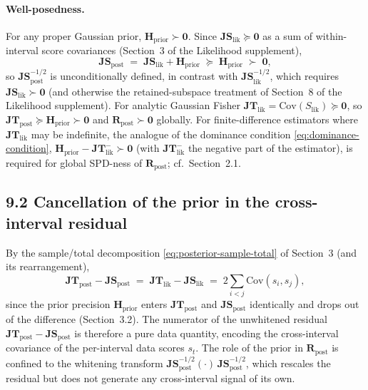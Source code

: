 \documentclass[11pt]{article}
\begin{document}
\paragraph{Well-posedness.}
For any proper Gaussian prior, $\mathbf H_{\mathrm{prior}} \succ \mathbf 0$. Since $\mathbf{JS}_{\mathrm{lik}} \succeq \mathbf 0$ as a sum of within-interval score covariances (Section~3 of the Likelihood supplement),
\begin{equation}
\mathbf{JS}_{\mathrm{post}}
\;=\;
\mathbf{JS}_{\mathrm{lik}} + \mathbf H_{\mathrm{prior}}
\;\succeq\;
\mathbf H_{\mathrm{prior}}
\;\succ\; \mathbf 0,
\label{eq:posterior-jspost-pd}
\end{equation}
so $\mathbf{JS}_{\mathrm{post}}^{-1/2}$ is unconditionally defined, in contrast with $\mathbf{JS}_{\mathrm{lik}}^{-1/2}$, which requires $\mathbf{JS}_{\mathrm{lik}} \succ \mathbf 0$ (and otherwise the retained-subspace treatment of Section~8 of the Likelihood supplement). For analytic Gaussian Fisher $\mathbf{JT}_{\mathrm{lik}} = \mathrm{Cov}(S_{\mathrm{lik}}) \succeq \mathbf 0$, so $\mathbf{JT}_{\mathrm{post}} \succeq \mathbf H_{\mathrm{prior}} \succ \mathbf 0$ and $\mathbf R_{\mathrm{post}} \succ \mathbf 0$ globally. For finite-difference estimators where $\mathbf{JT}_{\mathrm{lik}}$ may be indefinite, the analogue of the dominance condition \eqref{eq:dominance-condition}, $\mathbf H_{\mathrm{prior}} - \mathbf{JT}_{\mathrm{lik}}^{-} \succ \mathbf 0$ (with $\mathbf{JT}_{\mathrm{lik}}^{-}$ the negative part of the estimator), is required for global SPD-ness of $\mathbf R_{\mathrm{post}}$; cf.\ Section~2.1.

\subsection*{9.2 Cancellation of the prior in the cross-interval residual}

By the sample/total decomposition \eqref{eq:posterior-sample-total} of Section~3 (and its rearrangement),
\begin{equation}
\mathbf{JT}_{\mathrm{post}} - \mathbf{JS}_{\mathrm{post}}
\;=\;
\mathbf{JT}_{\mathrm{lik}} - \mathbf{JS}_{\mathrm{lik}}
\;=\;
2\sum_{i<j}\mathrm{Cov}(s_i, s_j),
\label{eq:posterior-r-residual}
\end{equation}
since the prior precision $\mathbf H_{\mathrm{prior}}$ enters $\mathbf{JT}_{\mathrm{post}}$ and $\mathbf{JS}_{\mathrm{post}}$ identically and drops out of the difference (Section~3.2). The numerator of the unwhitened residual $\mathbf{JT}_{\mathrm{post}} - \mathbf{JS}_{\mathrm{post}}$ is therefore a pure data quantity, encoding the cross-interval covariance of the per-interval data scores $s_t$. The role of the prior in $\mathbf R_{\mathrm{post}}$ is confined to the whitening transform $\mathbf{JS}_{\mathrm{post}}^{-1/2} (\cdot)\, \mathbf{JS}_{\mathrm{post}}^{-1/2}$, which rescales the residual but does not generate any cross-interval signal of its own.
\end{document}
